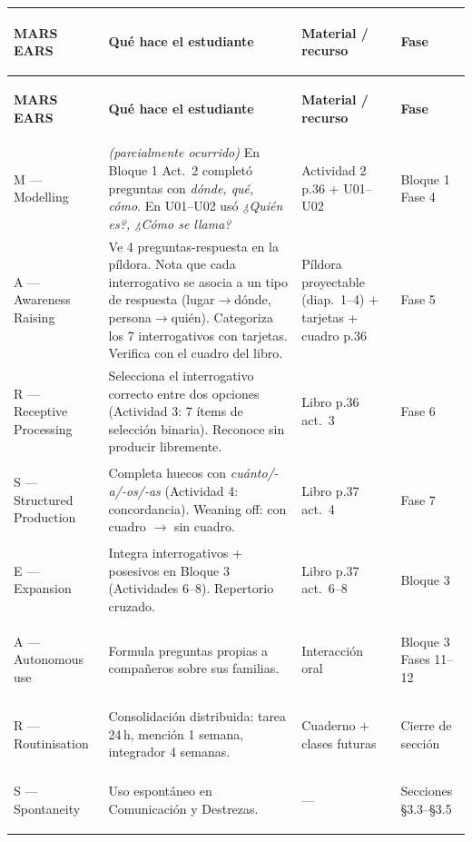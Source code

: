 \documentclass[a4paper,10pt]{article}
\renewcommand{\arraystretch}{1.3}
\begin{document}
\renewcommand{\arraystretch}{1.5}
{\small
\begin{longtable}{|>{\bfseries\raggedright\arraybackslash}p{2.2cm}|p{4.8cm}|p{3.8cm}|p{3.2cm}|}
\hline
\rowcolor{naranja!15}
\textbf{MARS EARS} & \textbf{Qué hace el estudiante} & \textbf{Material / recurso} & \textbf{Fase} \\
\hline
\endfirsthead
\hline
\rowcolor{naranja!15}
\textbf{MARS EARS} & \textbf{Qué hace el estudiante} & \textbf{Material / recurso} & \textbf{Fase} \\
\hline
\endhead

M --- Modelling &
\textit{(parcialmente ocurrido)} En Bloque 1 Act.~2 completó preguntas con \textit{dónde, qué, cómo}. En U01--U02 usó \textit{¿Quién es?, ¿Cómo se llama?} &
Actividad 2 p.36 + U01--U02 &
Bloque 1 Fase 4 \\
\hline

A --- Awareness Raising &
Ve 4 preguntas-respuesta en la píldora. Nota que cada interrogativo se asocia a un tipo de respuesta (lugar$\to$dónde, persona$\to$quién). Categoriza los 7 interrogativos con tarjetas. Verifica con el cuadro del libro. &
Píldora proyectable (diap.~1--4) + tarjetas + cuadro p.36 &
Fase 5 \\
\hline

R --- Receptive Processing &
Selecciona el interrogativo correcto entre dos opciones (Actividad 3: 7 ítems de selección binaria). Reconoce sin producir libremente. &
Libro p.36 act.~3 &
Fase 6 \\
\hline

S --- Structured Production &
Completa huecos con \textit{cuánto/-a/-os/-as} (Actividad 4: concordancia). Weaning off: con cuadro $\to$ sin cuadro. &
Libro p.37 act.~4 &
Fase 7 \\
\hline

E --- Expansion &
Integra interrogativos + posesivos en Bloque 3 (Actividades 6--8). Repertorio cruzado. &
Libro p.37 act.~6--8 &
Bloque 3 \\
\hline

A --- Autonomous use &
Formula preguntas propias a compañeros sobre sus familias. &
Interacción oral &
Bloque 3 Fases 11--12 \\
\hline

R --- Routinisation &
Consolidación distribuida: tarea 24\,h, mención 1 semana, integrador 4 semanas. &
Cuaderno + clases futuras &
Cierre de sección \\
\hline

S --- Spontaneity &
Uso espontáneo en Comunicación y Destrezas. &
--- &
Secciones §3.3--§3.5 \\
\hline
\end{longtable}
}
\end{document}
